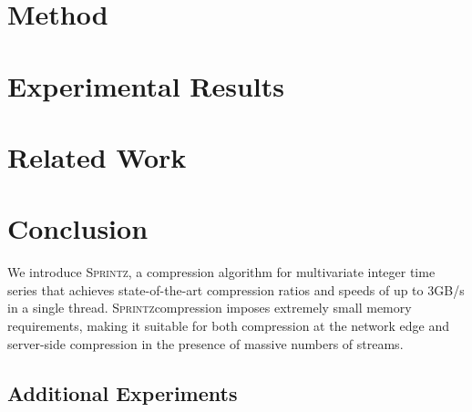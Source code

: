 \documentclass{vldb}
\newcommand{\minesp}{\textsc{Sprintz}\text{ }}
\newcommand{\fire}{\textsc{Fire}\text{ }}
\begin{document}
\section{Method} \label{sec:method}



\section{Experimental Results} \label{sec:results}



\section{Related Work} \label{sec:relatedWork}



\section{Conclusion} \label{sec:conclusion}

We introduce \minesp, a compression algorithm for multivariate integer time series that achieves state-of-the-art compression ratios and speeds of up to 3GB/s in a single thread. \minesp compression imposes extremely small memory requirements, making it suitable for both compression at the network edge and server-side compression in the presence of massive numbers of streams. %



\begin{appendix}
\section{Additional Experiments} \label{sec:moreResults}



\end{appendix}
\vspace{-1mm}


% 


\end{document}
